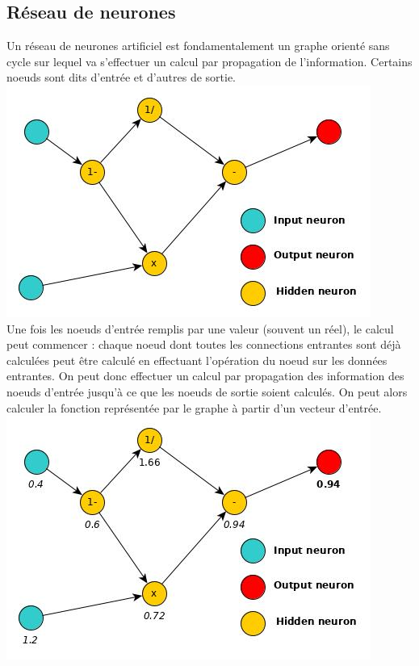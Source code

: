 \documentclass[12pt]{article}
\begin{document}
\subsection{Réseau de neurones}
Un réseau de neurones artificiel est fondamentalement un graphe orienté sans cycle sur lequel va s'effectuer un calcul par propagation de l'information. Certains noeuds sont dits d'entrée et d'autres de sortie. \\
\includegraphics[scale=0.45]{ex_neuron.jpg}\\
Une fois les noeuds d'entrée remplis par une valeur (souvent un réel), le calcul peut commencer : chaque noeud dont toutes les connections entrantes sont déjà calculées peut être calculé en effectuant l'opération du noeud sur les données entrantes. On peut donc effectuer un calcul par propagation des information des noeuds d'entrée jusqu'à ce que les noeuds de sortie soient calculés. On peut alors calculer la fonction représentée par le graphe à partir d'un vecteur d'entrée.\\
\includegraphics[scale=0.45]{ex_computation_neuron.jpg}\\
\end{document}

